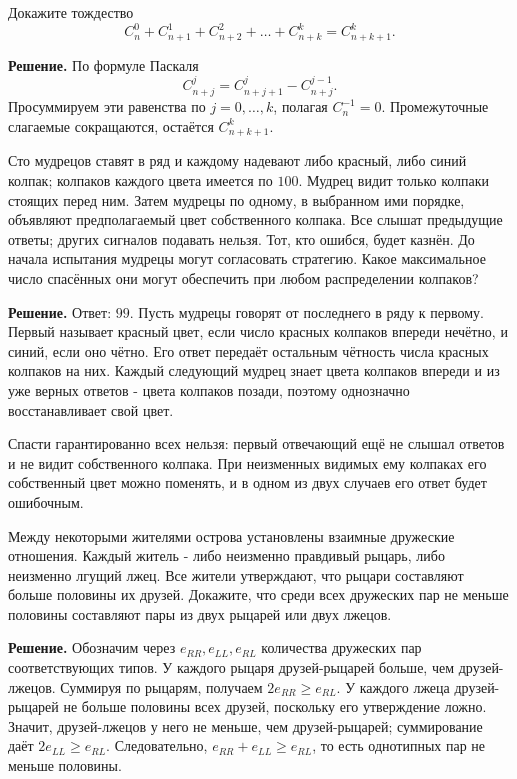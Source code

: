 \begin{problems}
\item Докажите тождество
\[
  C_n^0+C_{n+1}^1+C_{n+2}^2+\dots+C_{n+k}^k=C_{n+k+1}^k.
\]
\par\smallskip\noindent\textbf{Решение.} По формуле Паскаля
\[
C_{n+j}^{j}=C_{n+j+1}^{j}-C_{n+j}^{j-1}.
\]
Просуммируем эти равенства по $j=0,\ldots,k$, полагая $C_n^{-1}=0$. Промежуточные слагаемые сокращаются, остаётся $C_{n+k+1}^{k}$.\par

\item Сто мудрецов ставят в ряд и каждому надевают либо красный,
либо синий колпак; колпаков каждого цвета имеется по $100$.
Мудрец видит только колпаки стоящих перед ним. Затем мудрецы по одному,
в выбранном ими порядке, объявляют предполагаемый цвет собственного
колпака. Все слышат предыдущие ответы; других сигналов подавать нельзя.
Тот, кто ошибся, будет казнён. До начала испытания мудрецы могут
согласовать стратегию. Какое максимальное число спасённых они могут
обеспечить при любом распределении колпаков?
\par\smallskip\noindent\textbf{Решение.} Ответ: $99$. Пусть мудрецы говорят от последнего в ряду к первому. Первый называет красный цвет, если число красных колпаков впереди нечётно, и синий, если оно чётно. Его ответ передаёт остальным чётность числа красных колпаков на них. Каждый следующий мудрец знает цвета колпаков впереди и из уже верных ответов - цвета колпаков позади, поэтому однозначно восстанавливает свой цвет.
\par Спасти гарантированно всех нельзя: первый отвечающий ещё не слышал ответов и не видит собственного колпака. При неизменных видимых ему колпаках его собственный цвет можно поменять, и в одном из двух случаев его ответ будет ошибочным.\par

\item Между некоторыми жителями острова установлены взаимные дружеские
отношения. Каждый житель - либо неизменно правдивый рыцарь, либо
неизменно лгущий лжец. Все жители утверждают, что рыцари составляют
больше половины их друзей. Докажите, что среди всех дружеских пар
не меньше половины составляют пары из двух рыцарей или двух лжецов.
\par\smallskip\noindent\textbf{Решение.} Обозначим через $e_{RR},e_{LL},e_{RL}$ количества дружеских пар соответствующих типов. У каждого рыцаря друзей-рыцарей больше, чем друзей-лжецов. Суммируя по рыцарям, получаем $2e_{RR}\ge e_{RL}$. У каждого лжеца друзей-рыцарей не больше половины всех друзей, поскольку его утверждение ложно. Значит, друзей-лжецов у него не меньше, чем друзей-рыцарей; суммирование даёт $2e_{LL}\ge e_{RL}$. Следовательно, $e_{RR}+e_{LL}\ge e_{RL}$, то есть однотипных пар не меньше половины.\par


\end{problems}
